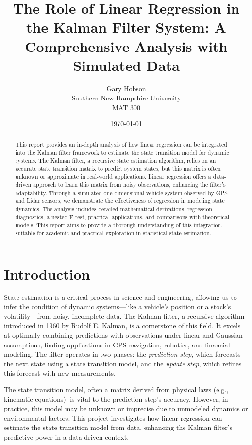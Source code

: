 \documentclass[12pt]{article}
\title{The Role of Linear Regression in the Kalman Filter System: A Comprehensive Analysis with Simulated Data}
\author{Gary Hobson \\ Southern New Hampshire University \\ MAT 300}
\date{\today}
\begin{document}
\maketitle

\begin{abstract}
This report provides an in-depth analysis of how linear regression can be integrated into the Kalman filter framework to estimate the state transition model for dynamic systems. The Kalman filter, a recursive state estimation algorithm, relies on an accurate state transition matrix to predict system states, but this matrix is often unknown or approximate in real-world applications. Linear regression offers a data-driven approach to learn this matrix from noisy observations, enhancing the filter’s adaptability. Through a simulated one-dimensional vehicle system observed by GPS and Lidar sensors, we demonstrate the effectiveness of regression in modeling state dynamics. The analysis includes detailed mathematical derivations, regression diagnostics, a nested F-test, practical applications, and comparisons with theoretical models. This report aims to provide a thorough understanding of this integration, suitable for academic and practical exploration in statistical state estimation.
\end{abstract}
\newpage

\tableofcontents
\clearpage

\section{Introduction}
\label{sec:intro}

State estimation is a critical process in science and engineering, allowing us to infer the condition of dynamic systems—like a vehicle’s position or a stock’s volatility—from noisy, incomplete data. The Kalman filter, a recursive algorithm introduced in 1960 by Rudolf E. Kalman, is a cornerstone of this field. It excels at optimally combining predictions with observations under linear and Gaussian assumptions, finding applications in GPS navigation, robotics, and financial modeling. The filter operates in two phases: the \textit{prediction step}, which forecasts the next state using a state transition model, and the \textit{update step}, which refines this forecast with new measurements.

The state transition model, often a matrix derived from physical laws (e.g., kinematic equations), is vital to the prediction step’s accuracy. However, in practice, this model may be unknown or imprecise due to unmodeled dynamics or environmental factors. This project investigates how linear regression can estimate the state transition model from data, enhancing the Kalman filter’s predictive power in a data-driven context.
\end{document}
